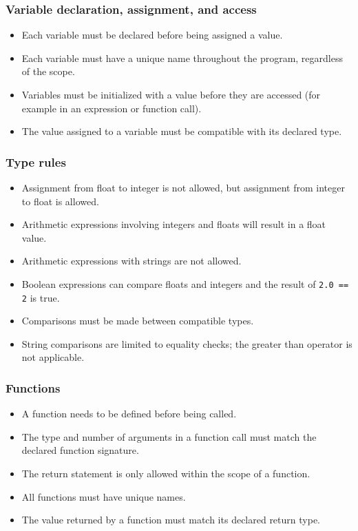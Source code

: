 \subsubsection{Variable declaration, assignment, and access}

\begin{itemize}
    \item Each variable must be declared before being assigned a value.
    \item Each variable must have a unique name throughout the program, regardless of the scope.
    \item Variables must be initialized with a value before they are accessed (for example in an expression or function call).
    \item The value assigned to a variable must be compatible with its declared type.
\end{itemize}

\subsubsection{Type rules}

\begin{itemize}
    \item Assignment from float to integer is not allowed, but assignment from integer to float is allowed.
    \item Arithmetic expressions involving integers and floats will result in a float value.
    \item Arithmetic expressions with strings are not allowed.
    \item Boolean expressions can compare floats and integers and the result of \texttt{2.0 == 2} is true.
    \item Comparisons must be made between compatible types.
    \item String comparisons are limited to equality checks; the greater than operator is not applicable.
    \end{itemize}

\subsubsection{Functions}

\begin{itemize}
    \item A function needs to be defined before being called.
    \item The type and number of arguments in a function call must match the declared function signature.
    \item The return statement is only allowed within the scope of a function.
    \item All functions must have unique names.
    \item The value returned by a function must match its declared return type.
    \end{itemize}

